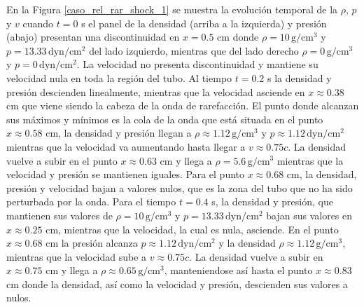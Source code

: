 \documentclass[12pt,a4paper]{book}
\begin{document}
En la Figura \ref{caso_rel_rar_shock_1} se muestra la evolución temporal de la $\rho$, $p$ y $v$
cuando $t = 0$ s el panel de la densidad 
(arriba a la izquierda) 
y presión (abajo) presentan una discontinuidad en $x = 0.5$ cm donde $\rho = 10 \,  \text{g}/ \text{cm}^3$
y $p = 13.33 \,  \text{dyn}/ \text{cm}^2 $ del lado izquierdo, mientras que del lado derecho $\rho = 0  \,  \text{g}/ \text{cm}^3$
y $p = 0 \,  \text{dyn}/ \text{cm}^2 $. La velocidad no presenta discontinuidad y mantiene su 
velocidad nula en toda la región del tubo. 
Al tiempo $t =0.2$ s la densidad y presión 
descienden linealmente, mientras que la velocidad asciende en $x \approx 0.38$ cm
que viene siendo la cabeza de la onda de rarefacción. El punto donde alcanzan 
sus máximos y mínimos es la cola de la onda que está situada en el punto $x \approx 0.58$ cm,
la densidad y presión llegan a $\rho \approx 1.12 \,  \text{g}/ \text{cm}^3$ y 
$p \approx 1.12\,  \text{dyn}/ \text{cm}^2 $ mientras que la velocidad
va aumentando hasta llegar a $v \approx 0.75c$. La densidad vuelve a subir en el punto $x \approx 0.63$ cm
y llega a $\rho = 5.6  \,  \text{g}/ \text{cm}^3$ mientras que la velocidad y presión se mantienen iguales. Para el punto
$x \approx 0.68$ cm, la densidad, presión y velocidad bajan a valores nulos, que es la zona del tubo que
no ha sido perturbada por la onda.
Para el tiempo $t = 0.4$ s, la densidad y presión, que mantienen sus valores de 
$\rho = 10 \,  \text{g}/ \text{cm}^3$ y 
$p = 13.33 \,  \text{dyn}/ \text{cm}^2 $ bajan sus valores en $x \approx 0.25$ cm, mientras que la velocidad, la cual es nula,
asciende. En el punto $x \approx 0.68$ cm la presión alcanza $p \approx 1.12\,  \text{dyn}/ \text{cm}^2 $ y la densidad
$\rho \approx 1.12 \,  \text{g}/ \text{cm}^3$, mientras que la velocidad sube a $v \approx 0.75c$. 
La densidad vuelve a subir
en $x \approx 0.75$ cm y llega a $\rho \approx 0.65 \,  \text{g}/ \text{cm}^3$, manteniendose así hasta el punto $x \approx 0.83$ cm
donde la densidad, así como la velocidad y presión, descienden sus valores a nulos.
\end{document}
